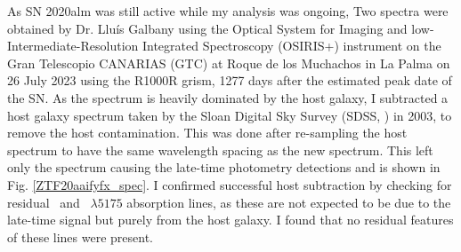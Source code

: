 \documentclass[a4paper,oneside,12pt, class=Latex/Classes/PhDthesisPSnPDF, crop=false]{standalone}
\begin{document}
As SN 2020alm was still active while my analysis was ongoing, Two spectra were obtained by Dr. Lluís Galbany using the Optical System for Imaging and low-Intermediate-Resolution Integrated Spectroscopy (OSIRIS+) instrument on the Gran Telescopio CANARIAS (GTC) at Roque de los Muchachos in La Palma on 26 July 2023 using the R1000R grism, 1277 days after the estimated peak date of the SN. As the spectrum is heavily dominated by the host galaxy, I subtracted a host galaxy spectrum taken by the Sloan Digital Sky Survey (SDSS, \citealt{SDSS-I-II, SDSS_DR4, SDSS_telescope, SDSS_Spectograph}) in 2003, to remove the host contamination. This was done after re-sampling the host spectrum to have the same wavelength spacing as the new spectrum. This left only the spectrum causing the late-time photometry detections and is shown in Fig. \ref{ZTF20aaifyfx_spec}. I confirmed successful host subtraction by checking for residual \NaID~and \MgI~${\lambda5175}$ absorption lines, as these are not expected to be due to the late-time signal but purely from the host galaxy. I found that no residual features of these lines were present.
\end{document}

